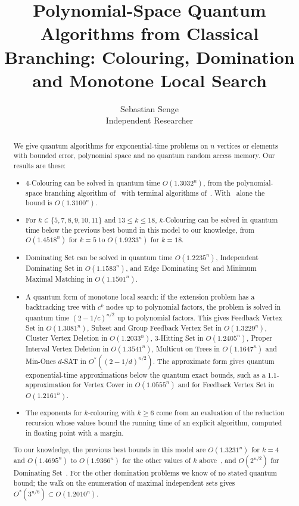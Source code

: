 \documentclass[11pt]{article}
\title{Polynomial-Space Quantum Algorithms from Classical Branching: Colouring, Domination and Monotone Local Search}
\author{Sebastian Senge\\ Independent Researcher}
\date{}
\theoremstyle{remark}
\begin{document}
\maketitle

\begin{abstract}
We give quantum algorithms for exponential-time problems on $n$ vertices or elements with bounded error, polynomial space and no quantum random access memory. Our results are these:
\begin{itemize}[leftmargin=1.5em]
\item 4-Colouring can be solved in quantum time $O(1.3032^n)$, from the polynomial-space branching algorithm of~\cite{WGJ24} with terminal algorithms of~\cite{YS26}. With~\cite{WGJ24} alone the bound is $O(1.3100^n)$.
\item For $k \in \{5, 7, 8, 9, 10, 11\}$ and $13 \le k \le 18$, $k$-Colouring can be solved in quantum time below the previous best bound in this model to our knowledge, from $O(1.4518^n)$ for $k = 5$ to $O(1.9233^n)$ for $k = 18$.
\item Dominating Set can be solved in quantum time $O(1.2235^n)$, Independent Dominating Set in $O(1.1583^n)$, and Edge Dominating Set and Minimum Maximal Matching in $O(1.1501^n)$.
\item A quantum form of monotone local search: if the extension problem has a backtracking tree with $c^k$ nodes up to polynomial factors, the problem is solved in quantum time $(2 - 1/c)^{n/2}$ up to polynomial factors. This gives Feedback Vertex Set in $O(1.3081^n)$, Subset and Group Feedback Vertex Set in $O(1.3229^n)$, Cluster Vertex Deletion in $O(1.2033^n)$, 3-Hitting Set in $O(1.2405^n)$, Proper Interval Vertex Deletion in $O(1.3541^n)$, Multicut on Trees in $O(1.1647^n)$ and Min-Ones $d$-SAT in $O^*((2-1/d)^{n/2})$. The approximate form gives quantum exponential-time approximations below the quantum exact bounds, such as a $1.1$-approximation for Vertex Cover in $O(1.0555^n)$ and for Feedback Vertex Set in $O(1.2161^n)$.
\item The exponents for $k$-colouring with $k \ge 6$ come from an evaluation of the reduction recursion whose values bound the running time of an explicit algorithm, computed in floating point with a margin.
\end{itemize}
To our knowledge, the previous best bounds in this model are $O(1.3231^n)$ for $k = 4$ and $O(1.4695^n)$ to $O(1.9366^n)$ for the other values of $k$ above~\cite{SM22}, and $O(2^{n/2})$ for Dominating Set~\cite{WCCV23}. For the other domination problems we know of no stated quantum bound; the walk on the enumeration of maximal independent sets gives $O^*(3^{n/6}) \subset O(1.2010^n)$.
\end{abstract}
\end{document}
